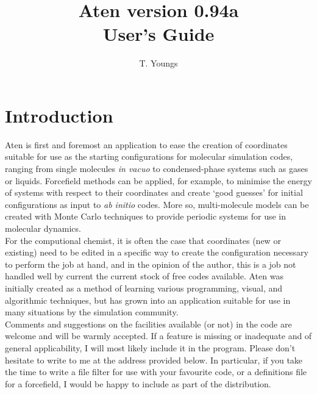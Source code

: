 \documentclass[a4paper,10pt]{report}
\begin{document}
\newenvironment{optlist}[1]
  {
    \begin{flushleft}\textbf{#1}\end{flushleft}
    \begin{list}{}{}
  }
  { \end{list} }

\newcommand{\progname}{{\sffamily Aten}}
\newcommand{\qte}[1]{\lq{}#1\rq{}}
\newcommand{\ttqte}[1]{\lq{}{\ttfamily#1}\rq{}}
\newcommand{\dqte}[1]{``#1''}
\newcommand{\its}{\hspace{20cm}}

\title{\progname{} version 0.94a \\ User's Guide}
\author{T. Youngs}
\maketitle

\tableofcontents

\clearpage

\section{Introduction}

\progname{} is first and foremost an application to ease the creation of coordinates suitable for use as the starting configurations for molecular simulation codes, ranging from single molecules \textit{in vacuo} to condensed-phase systems such as gases or liquids. Forcefield methods can be applied, for example, to minimise the energy of systems with respect to their coordinates and create \qte{good guesses} for initial configurations as input to \textit{ab initio} codes. More so, multi-molecule models can be created with Monte Carlo techniques to provide periodic systems for use in molecular dynamics.\\

For the computional chemist, it is often the case that coordinates (new or existing) need to be edited in a specific way to create the configuration necessary to perform the job at hand, and in the opinion of the author, this is a job not handled well by current the current stock of free codes available. \progname{} was initially created as a method of learning various programming, visual, and algorithmic techniques, but has grown into an application suitable for use in many situations by the simulation community.\\

Comments and suggestions on the facilities available (or not) in the code are welcome and will be warmly accepted. If a feature is missing or inadequate and of general applicability, I will most likely include it in the program. Please don't hesitate to write to me at the address provided below. In particular, if you take the time to write a file filter for use with your favourite code, or a definitions file for a forcefield, I would be happy to include as part of the distribution.\\
\end{document}
